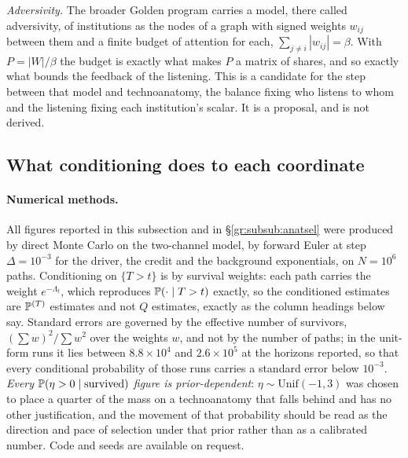 \emph{Adversivity.} The broader Golden program carries a model, there called
adversivity, of institutions as the nodes of a graph with signed weights
$w_{ij}$ between them and a finite budget of attention for each,
$\sum_{j\neq i}|w_{ij}|=\beta$. With $P=|W|/\beta$ the budget is exactly
what makes $P$ a matrix of shares, and so exactly what bounds the
feedback of the listening. This is a candidate for the step between that
model and technoanatomy, the balance fixing who listens to whom and the
listening fixing each institution's scalar. It is a proposal, and is not
derived.

\subsection{What conditioning does to each coordinate}
\label{gr:subsub:measured}

\paragraph{Numerical methods.} All figures reported in this subsection and
in \S\ref{gr:subsub:anatsel} were produced by direct Monte Carlo on the
two-channel model, by forward Euler at step $\Delta=10^{-3}$ for the
driver, the credit and the background exponentials, on $N=10^{6}$ paths.
Conditioning on $\{T>t\}$ is by survival weights: each path carries the
weight $e^{-\Lambda_t}$, which reproduces $\mathbb{P}(\cdot\mid T>t)$ exactly, so
the conditioned estimates are $\mathbb{P}^{(T)}$ estimates and not $Q$ estimates,
exactly as the column headings below say. Standard errors are governed by
the effective number of survivors, $(\sum w)^2/\sum w^2$ over the weights
$w$, and not by the number of paths; in the unit-form runs it lies between
$8.8\times10^{4}$ and $2.6\times10^{5}$ at the horizons reported, so that
every conditional probability of those runs carries a standard error below
$10^{-3}$. \emph{Every $\mathbb{P}(\eta>0\mid\text{survived})$
figure is prior-dependent}: $\eta\sim\mathrm{Unif}(-1,3)$ was chosen to
place a quarter of the mass on a technoanatomy that falls behind and has
no other justification, and the movement of that probability should be
read as the direction and pace of selection under that prior rather than
as a calibrated number. Code and seeds are available on request.

